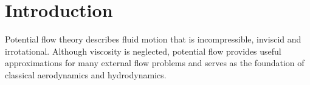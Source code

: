\section{Introduction}
\label{sec:introduction}

Potential flow theory describes fluid motion that is
incompressible, inviscid and irrotational.
Although viscosity is neglected, potential flow provides useful
approximations for many external flow problems and serves as the
foundation of classical aerodynamics and hydrodynamics.
